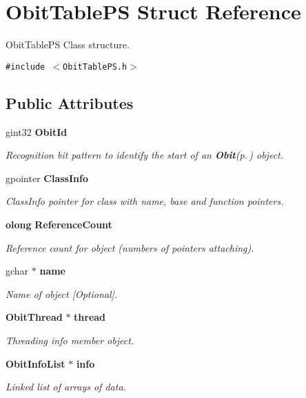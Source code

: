 \section{Obit\-Table\-PS Struct Reference}
\label{structObitTablePS}
Obit\-Table\-PS Class structure.  


{\tt \#include $<$Obit\-Table\-PS.h$>$}

\subsection*{Public Attributes}
\begin{CompactItemize}
\item 
gint32 {\bf Obit\-Id}
\begin{CompactList}\small\item\em Recognition bit pattern to identify the start of an {\bf Obit}{\rm (p.\,\pageref{structObit})} object. \item\end{CompactList}\item 
gpointer {\bf Class\-Info}
\begin{CompactList}\small\item\em Class\-Info pointer for class with name, base and function pointers. \item\end{CompactList}\item 
{\bf olong} {\bf Reference\-Count}
\begin{CompactList}\small\item\em Reference count for object (numbers of pointers attaching). \item\end{CompactList}\item 
gchar $\ast$ {\bf name}
\begin{CompactList}\small\item\em Name of object [Optional]. \item\end{CompactList}\item 
{\bf Obit\-Thread} $\ast$ {\bf thread}
\begin{CompactList}\small\item\em Threading info member object. \item\end{CompactList}\item 
{\bf Obit\-Info\-List} $\ast$ {\bf info}
\begin{CompactList}\small\item\em Linked list of arrays of data. \item\end{CompactList}\item 

\end{CompactItemize}
